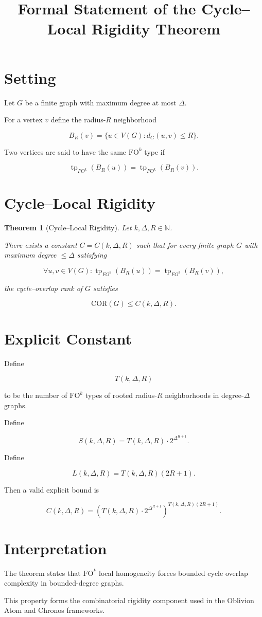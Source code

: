 \documentclass[11pt]{article}
\title{Formal Statement of the Cycle--Local Rigidity Theorem}
\author{}
\date{}
\newtheorem{theorem}{Theorem}
\begin{document}
\maketitle

\section{Setting}

Let $G$ be a finite graph with maximum degree at most $\Delta$.

For a vertex $v$ define the radius-$R$ neighborhood

\[
B_R(v)=\{u\in V(G) : d_G(u,v)\le R\}.
\]

Two vertices are said to have the same $\mathrm{FO}^k$ type if

\[
\operatorname{tp}_{FO^k}(B_R(u))
=
\operatorname{tp}_{FO^k}(B_R(v)).
\]

\section{Cycle--Local Rigidity}

\begin{theorem}[Cycle--Local Rigidity]

Let $k,\Delta,R\in\mathbb N$.

There exists a constant $C=C(k,\Delta,R)$ such that for every finite graph
$G$ with maximum degree $\le \Delta$ satisfying

\[
\forall u,v\in V(G):
\operatorname{tp}_{FO^k}(B_R(u))
=
\operatorname{tp}_{FO^k}(B_R(v)),
\]

the cycle--overlap rank of $G$ satisfies

\[
\mathrm{COR}(G) \le C(k,\Delta,R).
\]

\end{theorem}

\section{Explicit Constant}

Define

\[
T(k,\Delta,R)
\]

to be the number of $\mathrm{FO}^k$ types of rooted radius-$R$
neighborhoods in degree-$\Delta$ graphs.

Define

\[
S(k,\Delta,R)=T(k,\Delta,R)\cdot 2^{\Delta^{R+1}}.
\]

Define

\[
L(k,\Delta,R)=T(k,\Delta,R)(2R+1).
\]

Then a valid explicit bound is

\[
C(k,\Delta,R)
=
\left(
T(k,\Delta,R)\cdot 2^{\Delta^{R+1}}
\right)^{T(k,\Delta,R)(2R+1)}.
\]

\section{Interpretation}

The theorem states that $\mathrm{FO}^k$ local homogeneity forces
bounded cycle overlap complexity in bounded-degree graphs.

This property forms the combinatorial rigidity component used in the
Oblivion Atom and Chronos frameworks.
\end{document}
